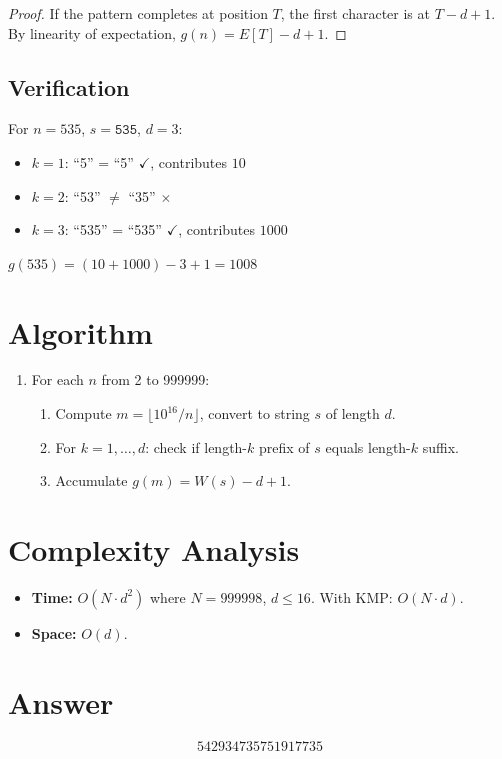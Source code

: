 \documentclass[12pt]{article}
\begin{document}
\begin{proof}
If the pattern completes at position $T$, the first character is at $T - d + 1$. By linearity of expectation, $g(n) = E[T] - d + 1$.
\end{proof}

\subsection{Verification}

For $n = 535$, $s = \texttt{535}$, $d = 3$:
\begin{itemize}
    \item $k=1$: ``5'' = ``5'' $\checkmark$, contributes $10$
    \item $k=2$: ``53'' $\neq$ ``35'' $\times$
    \item $k=3$: ``535'' = ``535'' $\checkmark$, contributes $1000$
\end{itemize}
$g(535) = (10 + 1000) - 3 + 1 = 1008$ \checkmark

\section{Algorithm}

\begin{enumerate}
    \item For each $n$ from 2 to 999999:
    \begin{enumerate}
        \item Compute $m = \lfloor 10^{16}/n \rfloor$, convert to string $s$ of length $d$.
        \item For $k = 1, \ldots, d$: check if length-$k$ prefix of $s$ equals length-$k$ suffix.
        \item Accumulate $g(m) = W(s) - d + 1$.
    \end{enumerate}
\end{enumerate}

\section{Complexity Analysis}

\begin{itemize}
    \item \textbf{Time:} $O(N \cdot d^2)$ where $N = 999998$, $d \le 16$. With KMP: $O(N \cdot d)$.
    \item \textbf{Space:} $O(d)$.
\end{itemize}

\section{Answer}

\[
\boxed{542934735751917735}
\]
\end{document}
